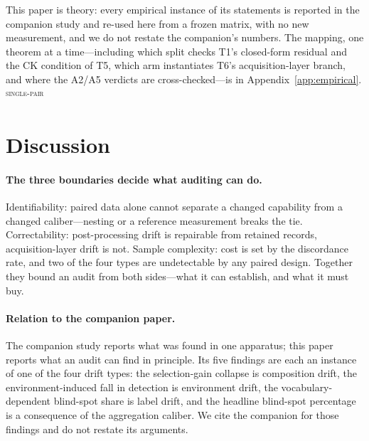 \documentclass{article}
\newcommand{\evtag}[1]{\textsuperscript{\textsc{#1}}}
\begin{document}
This paper is theory: every empirical instance of its statements is reported in the companion study and
re-used here from a frozen matrix, with no new measurement, and we do not restate the companion's numbers.
The mapping, one theorem at a time---including which split checks T1's closed-form residual and the CK
condition of T5, which arm instantiates T6's acquisition-layer branch, and where the A2/A5 verdicts are
cross-checked---is in Appendix~\ref{app:empirical}. \evtag{single-pair}

\section{Discussion}
\label{sec:discussion}

\paragraph{The three boundaries decide what auditing can do.} Identifiability: paired data alone cannot
separate a changed capability from a changed caliber---nesting or a reference measurement breaks the tie.
Correctability: post-processing drift is repairable from retained records, acquisition-layer drift is not.
Sample complexity: cost is set by the discordance rate, and two of the four types are undetectable by any
paired design. Together they bound an audit from both sides---what it can establish, and what it must buy.

\paragraph{Relation to the companion paper.} The companion study reports what was found in one apparatus;
this paper reports what an audit can find in principle. Its five findings are each an instance of one of the
four drift types: the selection-gain collapse is composition drift, the environment-induced fall in
detection is environment drift, the vocabulary-dependent blind-spot share is label drift, and the headline
blind-spot percentage is a consequence of the aggregation caliber. We cite the companion for those findings
and do not restate its arguments.
\end{document}
